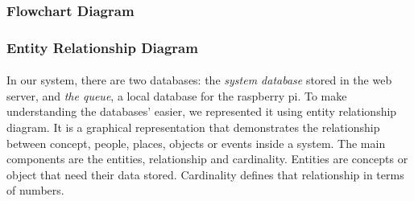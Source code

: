 \documentclass[12pt, oneside, a4paper]{book}
\begin{document}
						
				
				\newpage\subsubsection{Flowchart Diagram}
				\newpage\subsubsection{Entity Relationship Diagram}
					\paragraph{} In our system, there are two databases: the \textit{system database} stored in the web server, and \textit{the queue}, a local database for the raspberry pi. To make understanding the databases' easier, we represented it using entity relationship diagram. It is a graphical representation that demonstrates the relationship between concept, people, places, objects or events inside a system. The main components are the entities, relationship and cardinality. Entities are concepts or object that need their data stored. Cardinality defines that relationship in terms of numbers\cite{erd}.
				
\end{document}
